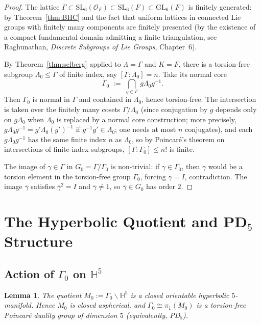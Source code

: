 \documentclass[12pt]{article}
\newtheorem{lemma}[theorem]{Lemma}
\theoremstyle{definition}
\begin{document}
\begin{proof}
The lattice $\Gamma\subset\mathrm{SL}_6(\mathcal{O}_F)\subset\mathrm{SL}_6(F)\subset\mathrm{GL}_6(F)$ is finitely generated: by Theorem~\ref{thm:BHC} and the fact that uniform lattices in connected Lie groups with finitely many components are finitely presented (by the existence of a compact fundamental domain admitting a finite triangulation, see Raghunathan, \emph{Discrete Subgroups of Lie Groups}, Chapter~6).

By Theorem~\ref{thm:selberg} applied to $\Lambda=\Gamma$ and $K=F$, there is a torsion-free subgroup $\Lambda_0\leq\Gamma$ of finite index, say $[\Gamma:\Lambda_0]=n$. Take its normal core
\[
\Gamma_0 \;:=\; \bigcap_{g\in\Gamma}\, g\Lambda_0 g^{-1}.
\]
Then $\Gamma_0$ is normal in $\Gamma$ and contained in $\Lambda_0$, hence torsion-free. The intersection is taken over the finitely many cosets $\Gamma/\Lambda_0$ (since conjugation by $g$ depends only on $g\Lambda_0$ when $\Lambda_0$ is replaced by a normal core construction; more precisely, $g\Lambda_0 g^{-1}=g'\Lambda_0 (g')^{-1}$ if $g^{-1}g'\in\Lambda_0$; one needs at most $n$ conjugates), and each $g\Lambda_0 g^{-1}$ has the same finite index $n$ as $\Lambda_0$, so by Poincar\'e's theorem on intersections of finite-index subgroups, $[\Gamma:\Gamma_0]\leq n!$ is finite.

The image of $\gamma\in\Gamma$ in $G_0=\Gamma/\Gamma_0$ is non-trivial: if $\gamma\in\Gamma_0$, then $\gamma$ would be a torsion element in the torsion-free group $\Gamma_0$, forcing $\gamma=I$, contradiction. The image $\bar\gamma$ satisfies $\bar\gamma^2=I$ and $\bar\gamma\neq 1$, so $\bar\gamma\in G_0$ has order $2$.
\end{proof}

\section{The Hyperbolic Quotient and PD$_5$ Structure}\label{sec:PD5}

\subsection{Action of $\Gamma_0$ on $\mathbb{H}^5$}

\begin{lemma}\label{lem:hyp5}
The quotient $M_0:=\Gamma_0\backslash\mathbb{H}^5$ is a closed orientable hyperbolic $5$-manifold. Hence $M_0$ is closed aspherical, and $\Gamma_0\cong\pi_1(M_0)$ is a torsion-free Poincar\'e duality group of dimension $5$ (equivalently, PD$_5$).
\end{lemma}
\end{document}
